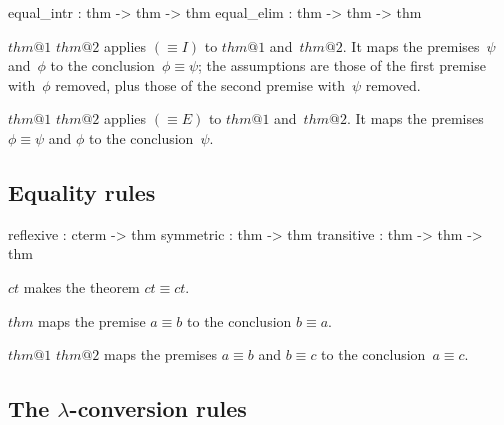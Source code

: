 \begin{ttbox} 
equal_intr : thm -> thm -> thm 
equal_elim : thm -> thm -> thm
\end{ttbox}
\begin{ttdescription}
\item[\ttindexbold{equal_intr} $thm@1$ $thm@2$] 
applies $({\equiv}I)$ to $thm@1$ and~$thm@2$.  It maps the premises~$\psi$
and~$\phi$ to the conclusion~$\phi\equiv\psi$; the assumptions are those of
the first premise with~$\phi$ removed, plus those of
the second premise with~$\psi$ removed.

\item[\ttindexbold{equal_elim} $thm@1$ $thm@2$] 
applies $({\equiv}E)$ to $thm@1$ and~$thm@2$.  It maps the premises
$\phi\equiv\psi$ and $\phi$ to the conclusion~$\psi$.
\end{ttdescription}


\subsection{Equality rules}

\begin{ttbox} 
reflexive  : cterm -> thm
symmetric  : thm -> thm
transitive : thm -> thm -> thm
\end{ttbox}
\begin{ttdescription}
\item[\ttindexbold{reflexive} $ct$] 
makes the theorem \(ct\equiv ct\). 

\item[\ttindexbold{symmetric} $thm$] 
maps the premise $a\equiv b$ to the conclusion $b\equiv a$.

\item[\ttindexbold{transitive} $thm@1$ $thm@2$] 
maps the premises $a\equiv b$ and $b\equiv c$ to the conclusion~${a\equiv c}$.
\end{ttdescription}


\subsection{The $\lambda$-conversion rules}

